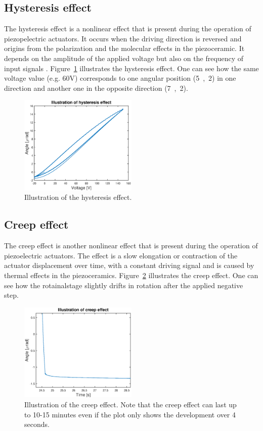 \subsection{Hysteresis effect}
The hysteresis effect is a nonlinear effect that is present during the operation of piezopelectric actuators. It occurs when the driving direction is reversed and origins from the polarization and the molecular effects in the piezoceramic. It depends on the amplitude of the applied voltage but also on the frequency of input signals \cite{Qingson:2016}. Figure~\ref{fig:hysteresis} illustrates the hysteresis effect. One can see how the same voltage value (e.g. 60V) corresponds to one angular position (\unit{5,2}{\micro\rad}) in one direction and another one in the opposite direction (\unit{7,2}{\micro\rad}).

\begin{figure}[h]
 \centering %
 \includegraphics[width=0.5\textwidth]{fig/matlab/hysteresis.eps}
 \caption{\label{fig:hysteresis}Illustration of the hysteresis effect.}
\end{figure}

\subsection{Creep effect}
The creep effect is another nonlinear effect that is present during the operation of piezoelectric actuators. The effect is a slow elongation or contraction of the actuator displacement over time, with a constant driving signal and is caused by thermal effects in the piezoceramics. Figure~\ref{fig:creep} illustrates the creep effect. One can see how the rotainalstage slightly drifts in rotation after the applied negative step.

\begin{figure}[h]
 \centering %
 \includegraphics[width=0.5\textwidth]{fig/matlab/creep.eps}
 \caption{\label{fig:creep}Illustration of the creep effect. Note that the creep effect can last up to 10-15 minutes even if the plot only shows the development over 4 seconds.}
\end{figure}

